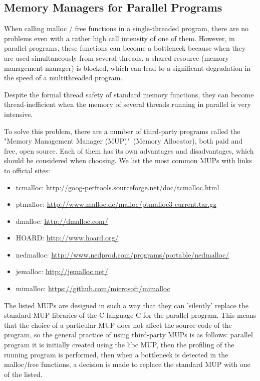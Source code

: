 { %
	\subsection{Memory Managers for Parallel Programs}
	\par When calling malloc / free functions in a single-threaded program, there are no problems even with a rather high call intensity of one of them. However, in parallel programs, these functions can become a bottleneck because when they are used simultaneously from several threads, a shared resource (memory management manager) is blocked, which can lead to a significant degradation in the speed of a multithreaded program.
	\par Despite the formal thread safety of standard memory functions, they can become thread-inefficient when the memory of several threads running in parallel is very intensive.
	\par To solve this problem, there are a number of third-party programs called the "Memory Management Manager (MUP)"\ (Memory Allocator), both paid and free, open source. Each of them has its own advantages and disadvantages, which should be considered when choosing. We list the most common MUPs with links to official sites:
	\begin{itemize}
		\sloppy
		\item tcmalloc: \url{http://goog-perftools.sourceforge.net/doc/tcmalloc.html}
		\item ptmalloc: \url{http://www.malloc.de/malloc/ptmalloc3-current.tar.gz}
		\item dmalloc: \url{http://dmalloc.com/}
		\item HOARD: \url{http://www.hoard.org/}
		\item nedmalloc: \url{http://www.nedprod.com/programs/portable/nedmalloc/}
		\item jemalloc: \url{http://jemalloc.net/}
		\item mimalloc: \url{https://github.com/microsoft/mimalloc}
	\end{itemize}
	\par The listed MUPs are designed in such a way that they can 'silently' replace the standard MUP libraries of the C language C for the parallel program. This means that the choice of a particular MUP does not affect the source code of the program, so the general practice of using third-party MUPs is as follows: parallel program it is initially created using the libc MUP, then the profiling of the running program is performed, then when a bottleneck is detected in the malloc/free functions, a decision is made to replace the standard MUP with one of the listed.
	\par
	\par
}